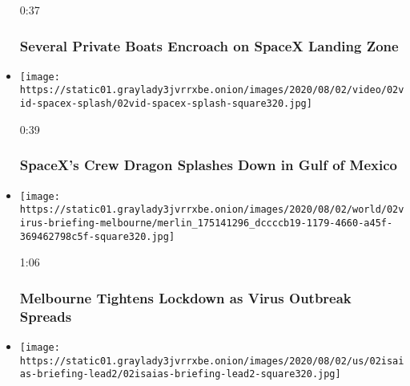 \begin{itemize}
  0:37

  \hypertarget{several-private-boats-encroach-on-spacex-landing-zone}{%
  \subsubsection{Several Private Boats Encroach on SpaceX Landing
  Zone}\label{several-private-boats-encroach-on-spacex-landing-zone}}
\item
  \href{https://www.nytimes3xbfgragh.onion/video/us/100000007269118/spacex-splash-down.html?action=click\&module=video-series-bar\&region=header\&pgtype=Article\&playlistId=video/latest-video}{}

  \texttt{[image: https://static01.graylady3jvrrxbe.onion/images/2020/08/02/video/02vid-spacex-splash/02vid-spacex-splash-square320.jpg]}

  0:39

  \hypertarget{spacexs-crew-dragon-splashes-down-in-gulf-of-mexico}{%
  \subsubsection{SpaceX's Crew Dragon Splashes Down in Gulf of
  Mexico}\label{spacexs-crew-dragon-splashes-down-in-gulf-of-mexico}}
\item
  \href{https://www.nytimes3xbfgragh.onion/video/world/australia/100000007269116/coronavirus-restrictions-melbourne.html?action=click\&module=video-series-bar\&region=header\&pgtype=Article\&playlistId=video/latest-video}{}

  \texttt{[image: https://static01.graylady3jvrrxbe.onion/images/2020/08/02/world/02virus-briefing-melbourne/merlin\_175141296\_dccccb19-1179-4660-a45f-369462798c5f-square320.jpg]}

  1:06

  \hypertarget{melbourne-tightens-lockdown-as-virus-outbreak-spreads}{%
  \subsubsection{Melbourne Tightens Lockdown as Virus Outbreak
  Spreads}\label{melbourne-tightens-lockdown-as-virus-outbreak-spreads}}
\item
  \href{https://www.nytimes3xbfgragh.onion/video/us/100000007268938/isaias-florida.html?action=click\&module=video-series-bar\&region=header\&pgtype=Article\&playlistId=video/latest-video}{}

  \texttt{[image: https://static01.graylady3jvrrxbe.onion/images/2020/08/02/us/02isaias-briefing-lead2/02isaias-briefing-lead2-square320.jpg]}


\end{itemize}
